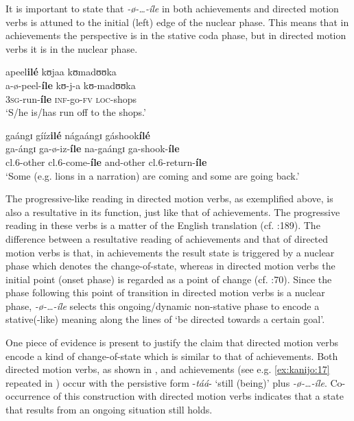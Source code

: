 \documentclass[output=paper,newtxmath,modfonts,nonflat,draftmode]{langsci/langscibook}
\begin{document}
It is important to state that \textit{-ø-…-íle} in both achievements and directed motion verbs is attuned to the initial (left) edge of the nuclear phase. This means that in achievements the perspective is in the stative coda phase, but in directed motion verbs it is in the nuclear phase.

\ea \label{ex:kanijo:21}
\ea
\glll apeel\textbf{ilé}  kʊjaa kʊmadʊʊka\\
 a-ø-peel-\textbf{íle} kʊ-j-a kʊ-madʊʊka\\
   3\textsc{sg}-run-\textbf{íle} \textsc{inf}-go-\textsc{fv} \textsc{loc}-shops\\
 \glt ‘S/he is/has run off to the shops.’

\ex 
\glll  gaángɪ     gííz\textbf{ilé}  nágaángɪ  gáshook\textbf{ílé}\\
 ga-ángɪ     ga-ø-iz-\textbf{íle}      na-gaángɪ  ga-shook-\textbf{íle}\\
 cl.6-other  cl.6-come-\textbf{íle} and-other   cl.6-return-\textbf{íle}\\
\glt ‘Some (e.g. lions in a narration) are coming and some are going back.’
\z
\z

The progressive-like reading in directed motion verbs, as exemplified above, is also a resultative in its function, just like that of achievements. The progressive reading in these verbs is a matter of the English translation (cf. \citealt{Ebert1995}:189). The difference between a resultative reading of achievements and that of directed motion verbs is that, in achievements the result state is triggered by a nuclear phase which denotes the change-of-state, whereas in directed motion verbs the initial point (onset phase) is regarded as a point of change (cf. \citealt{Smith1991}:70). Since the phase following this point of transition in directed motion verbs is a nuclear phase, \textit{-ø-…-íle} selects this ongoing/dynamic non-stative phase to encode a stative(-like) meaning along the lines of ‘be directed towards a certain goal’. 

One piece of evidence is present to justify the claim that directed motion verbs encode a kind of change-of-state which is similar to that of achievements. Both directed motion verbs, as shown in , and achievements (see e.g. \ref{ex:kanijo:17} repeated in ) occur with the persistive form -\textit{táá}- ‘still (being)’ plus \textit{-ø-…-íle}. Co-occurrence of this construction with directed motion verbs indicates that a state that results from an ongoing situation still holds.
\end{document}
